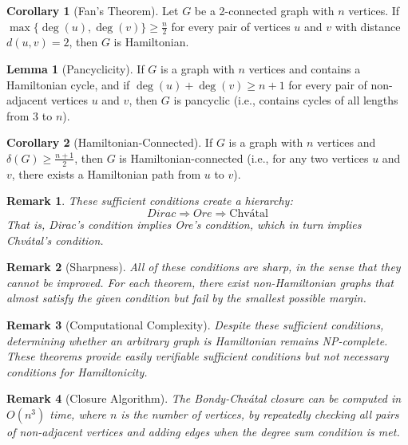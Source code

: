 \documentclass{article}
\newtheorem{remark}{Remark}
\theoremstyle{definition}
\newtheorem{lemma}{Lemma}
\newtheorem{corollary}{Corollary}
\begin{document}
\begin{corollary}[Fan's Theorem]
Let $G$ be a 2-connected graph with $n$ vertices. If $\max\{\deg(u), \deg(v)\} \geq \frac{n}{2}$ for every pair of vertices $u$ and $v$ with distance $d(u,v) = 2$, then $G$ is Hamiltonian.
\end{corollary}

\begin{lemma}[Pancyclicity]
If $G$ is a graph with $n$ vertices and contains a Hamiltonian cycle, and if $\deg(u) + \deg(v) \geq n+1$ for every pair of non-adjacent vertices $u$ and $v$, then $G$ is pancyclic (i.e., contains cycles of all lengths from 3 to $n$).
\end{lemma}

\begin{corollary}[Hamiltonian-Connected]
If $G$ is a graph with $n$ vertices and $\delta(G) \geq \frac{n+1}{2}$, then $G$ is Hamiltonian-connected (i.e., for any two vertices $u$ and $v$, there exists a Hamiltonian path from $u$ to $v$).
\end{corollary}

\begin{remark}
These sufficient conditions create a hierarchy:
\[Dirac \Rightarrow Ore \Rightarrow \text{Chv\'{a}tal}\]
That is, Dirac's condition implies Ore's condition, which in turn implies Chvátal's condition.
\end{remark}

\begin{remark}[Sharpness]
All of these conditions are sharp, in the sense that they cannot be improved. For each theorem, there exist non-Hamiltonian graphs that almost satisfy the given condition but fail by the smallest possible margin.
\end{remark}

\begin{remark}[Computational Complexity]
Despite these sufficient conditions, determining whether an arbitrary graph is Hamiltonian remains NP-complete. These theorems provide easily verifiable sufficient conditions but not necessary conditions for Hamiltonicity.
\end{remark}

\begin{remark}[Closure Algorithm]
The Bondy-Chvátal closure can be computed in $O(n^3)$ time, where $n$ is the number of vertices, by repeatedly checking all pairs of non-adjacent vertices and adding edges when the degree sum condition is met.
\end{remark}
\end{document}

